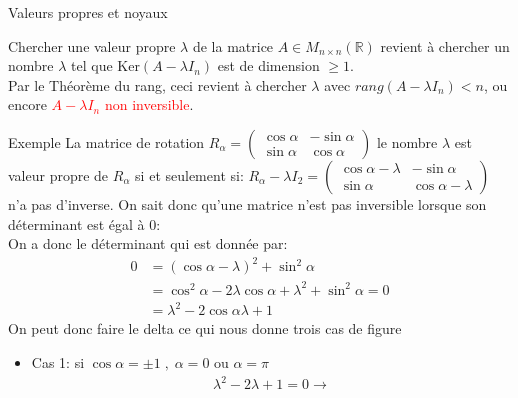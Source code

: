 \begin{parag}{Valeurs propres et noyaux}
\begin{subparag}
    Chercher une valeur propre $\lambda$ de la matrice $A \in M_{n \times n}(\mathbb{R})$ revient à chercher un nombre $\lambda$ tel que Ker$(A - \lambda I_n)$ est de dimension $\geq 1$.\\
    Par le Théorème du rang, ceci revient à chercher $\lambda$ avec $rang(A - \lambda I_n) < n$, ou encore \textcolor{red}{$A - \lambda I_n$ non inversible}.
\end{subparag}
\begin{subparag}{Exemple}
La matrice de rotation $R_\alpha = \begin{pmatrix}
    \cos \alpha & -\sin \alpha\\
    \sin \alpha & \cos \alpha
\end{pmatrix}$
    le nombre $\lambda$ est valeur propre de $R_\alpha$ si et seulement si:
    $R_\alpha - \lambda I_2 = \begin{pmatrix}
        \cos \alpha - \lambda & -\sin \alpha\\
        \sin \alpha& \cos \alpha - \lambda
    \end{pmatrix}$ n'a pas d'inverse. On sait donc qu'une matrice n'est pas inversible lorsque son déterminant est égal à $0$:
    \\
    On a donc le déterminant qui est donnée par:
    \begin{align*}
    0 &= (\cos \alpha - \lambda)^2 + \sin^2 \alpha \\
    &= \cos^2\alpha - 2\lambda\cos\alpha + \lambda^2 + \sin^2\alpha = 0\\
    &= \lambda^2 -2\cos\alpha \lambda + 1
    \end{align*}
    On peut donc faire le delta ce qui nous donne trois cas de figure
    \begin{itemize}
        \item Cas 1: si $\cos\alpha = \pm 1\; , \; \alpha = 0 \text{ ou }\alpha = \pi $\\
        \begin{align*}
            \lambda^2 - 2\lambda + 1 = 0 \to 
        \end{align*}
    \end{itemize}
    

\end{subparag}
\end{parag}
